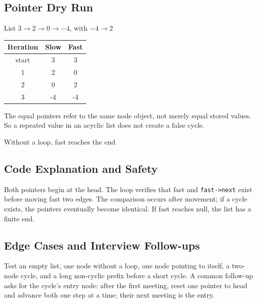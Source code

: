 \subsection{Pointer Dry Run}
\begin{dryrunbox}{List \(3\to2\to0\to-4\), with \(-4\to2\)}
\begin{center}
\begin{tabular}{@{}c c c@{}}
\toprule
Iteration & Slow & Fast \\
\midrule
start & 3 & 3 \\
1 & 2 & 0 \\
2 & 0 & 2 \\
3 & -4 & -4 \\
\bottomrule
\end{tabular}
\end{center}
The equal pointers refer to the same node object, not merely equal stored
values. So a repeated value in an acyclic list does not create a false
cycle.
\end{dryrunbox}

\begin{visualbox}{Without a loop, fast reaches the end}
\centering
{}
\end{visualbox}

\subsection{Code Explanation and Safety}
Both pointers begin at the head. The loop verifies that fast and
\texttt{fast->next} exist before moving fast two edges. The comparison occurs
after movement; if a cycle exists, the pointers eventually become identical.
If fast reaches null, the list has a finite end.

\subsection{Edge Cases and Interview Follow-ups}
Test an empty list, one node without a loop, one node pointing to itself, a
two-node cycle, and a long non-cyclic prefix before a short cycle. A common
follow-up asks for the cycle's entry node: after the first meeting, reset one
pointer to head and advance both one step at a time; their next meeting is the
entry.

